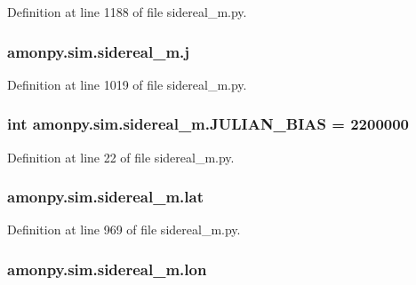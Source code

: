 Definition at line 1188 of file sidereal\-\_\-m.\-py.

\hypertarget{namespaceamonpy_1_1sim_1_1sidereal__m_aa758d2473c2479088d5bbda5e961a8e3}{
\subsubsection[{j}]{\setlength{\rightskip}{0pt plus 5cm}amonpy.\-sim.\-sidereal\-\_\-m.\-j}}\label{namespaceamonpy_1_1sim_1_1sidereal__m_aa758d2473c2479088d5bbda5e961a8e3}


Definition at line 1019 of file sidereal\-\_\-m.\-py.

\hypertarget{namespaceamonpy_1_1sim_1_1sidereal__m_a56431e0d53d6e44010a9f50886823cf6}{
\subsubsection[{J\-U\-L\-I\-A\-N\-\_\-\-B\-I\-A\-S}]{\setlength{\rightskip}{0pt plus 5cm}int amonpy.\-sim.\-sidereal\-\_\-m.\-J\-U\-L\-I\-A\-N\-\_\-\-B\-I\-A\-S = 2200000}}\label{namespaceamonpy_1_1sim_1_1sidereal__m_a56431e0d53d6e44010a9f50886823cf6}


Definition at line 22 of file sidereal\-\_\-m.\-py.

\hypertarget{namespaceamonpy_1_1sim_1_1sidereal__m_a9cb235680ba0dd6b44d2115b59486c07}{
\subsubsection[{lat}]{\setlength{\rightskip}{0pt plus 5cm}amonpy.\-sim.\-sidereal\-\_\-m.\-lat}}\label{namespaceamonpy_1_1sim_1_1sidereal__m_a9cb235680ba0dd6b44d2115b59486c07}


Definition at line 969 of file sidereal\-\_\-m.\-py.

\hypertarget{namespaceamonpy_1_1sim_1_1sidereal__m_ab46193951f3647dcd0147e60f560a572}{
\subsubsection[{lon}]{\setlength{\rightskip}{0pt plus 5cm}amonpy.\-sim.\-sidereal\-\_\-m.\-lon}}\label{namespaceamonpy_1_1sim_1_1sidereal__m_ab46193951f3647dcd0147e60f560a572}


